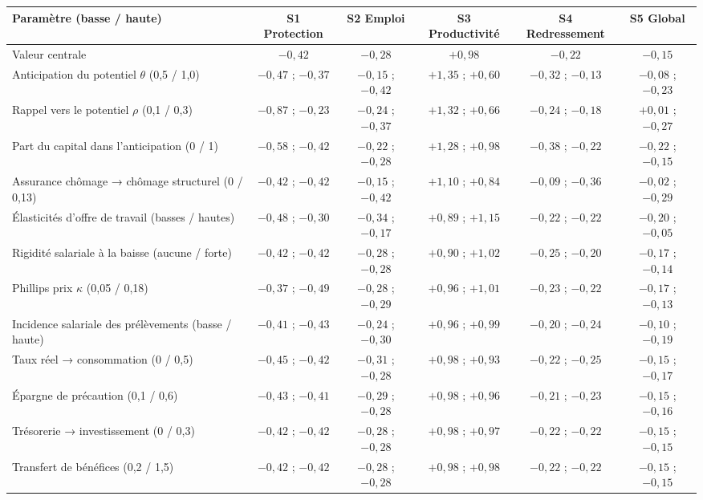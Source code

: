\begin{tabular}{lccccc}\toprule
Paramètre (basse / haute) & S1 Protection & S2 Emploi & S3 Productivité & S4 Redressement & S5 Global \\ \midrule
Valeur centrale & $-0{,}42$ & $-0{,}28$ & $+0{,}98$ & $-0{,}22$ & $-0{,}15$ \\ \midrule
Anticipation du potentiel $\theta$ (0,5 / 1,0) & $-0{,}47$ ; $-0{,}37$ & $-0{,}15$ ; $-0{,}42$ & $+1{,}35$ ; $+0{,}60$ & $-0{,}32$ ; $-0{,}13$ & $-0{,}08$ ; $-0{,}23$ \\
Rappel vers le potentiel $\rho$ (0,1 / 0,3) & $-0{,}87$ ; $-0{,}23$ & $-0{,}24$ ; $-0{,}37$ & $+1{,}32$ ; $+0{,}66$ & $-0{,}24$ ; $-0{,}18$ & $+0{,}01$ ; $-0{,}27$ \\
Part du capital dans l'anticipation (0 / 1) & $-0{,}58$ ; $-0{,}42$ & $-0{,}22$ ; $-0{,}28$ & $+1{,}28$ ; $+0{,}98$ & $-0{,}38$ ; $-0{,}22$ & $-0{,}22$ ; $-0{,}15$ \\
Assurance chômage → chômage structurel (0 / 0,13) & $-0{,}42$ ; $-0{,}42$ & $-0{,}15$ ; $-0{,}42$ & $+1{,}10$ ; $+0{,}84$ & $-0{,}09$ ; $-0{,}36$ & $-0{,}02$ ; $-0{,}29$ \\
Élasticités d'offre de travail (basses / hautes) & $-0{,}48$ ; $-0{,}30$ & $-0{,}34$ ; $-0{,}17$ & $+0{,}89$ ; $+1{,}15$ & $-0{,}22$ ; $-0{,}22$ & $-0{,}20$ ; $-0{,}05$ \\
Rigidité salariale à la baisse (aucune / forte) & $-0{,}42$ ; $-0{,}42$ & $-0{,}28$ ; $-0{,}28$ & $+0{,}90$ ; $+1{,}02$ & $-0{,}25$ ; $-0{,}20$ & $-0{,}17$ ; $-0{,}14$ \\
Phillips prix $\kappa$ (0,05 / 0,18) & $-0{,}37$ ; $-0{,}49$ & $-0{,}28$ ; $-0{,}29$ & $+0{,}96$ ; $+1{,}01$ & $-0{,}23$ ; $-0{,}22$ & $-0{,}17$ ; $-0{,}13$ \\
Incidence salariale des prélèvements (basse / haute) & $-0{,}41$ ; $-0{,}43$ & $-0{,}24$ ; $-0{,}30$ & $+0{,}96$ ; $+0{,}99$ & $-0{,}20$ ; $-0{,}24$ & $-0{,}10$ ; $-0{,}19$ \\
Taux réel → consommation (0 / 0,5) & $-0{,}45$ ; $-0{,}42$ & $-0{,}31$ ; $-0{,}28$ & $+0{,}98$ ; $+0{,}93$ & $-0{,}22$ ; $-0{,}25$ & $-0{,}15$ ; $-0{,}17$ \\
Épargne de précaution (0,1 / 0,6) & $-0{,}43$ ; $-0{,}41$ & $-0{,}29$ ; $-0{,}28$ & $+0{,}98$ ; $+0{,}96$ & $-0{,}21$ ; $-0{,}23$ & $-0{,}15$ ; $-0{,}16$ \\
Trésorerie → investissement (0 / 0,3) & $-0{,}42$ ; $-0{,}42$ & $-0{,}28$ ; $-0{,}28$ & $+0{,}98$ ; $+0{,}97$ & $-0{,}22$ ; $-0{,}22$ & $-0{,}15$ ; $-0{,}15$ \\
Transfert de bénéfices (0,2 / 1,5) & $-0{,}42$ ; $-0{,}42$ & $-0{,}28$ ; $-0{,}28$ & $+0{,}98$ ; $+0{,}98$ & $-0{,}22$ ; $-0{,}22$ & $-0{,}15$ ; $-0{,}15$ \\
\bottomrule\end{tabular}
